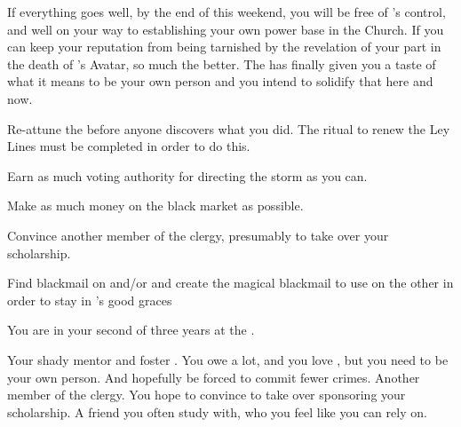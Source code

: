 \documentclass[char]{GL2020}
\begin{document}
If everything goes well, by the end of this weekend, you will be free of \cAntiChup{}’s control, and well on your way to establishing your own power base in the Church. If you can keep your reputation from being tarnished by the revelation of your part in the death of \cEbb{}’s Avatar, so much the better. The \pSchool{} has finally given you a taste of what it means to be your own person and you intend to solidify that here and now.

\begin{itemz}[Goals]
	\item Re-attune the \iNet{} before anyone discovers what you did. The ritual to renew the Ley Lines must be completed in order to do this.
	\item Earn as much voting authority for directing the storm as you can.
	\item Make as much money on the black market as possible.
	\item Convince another member of the \pTech{} clergy, presumably \cBeetle{} to take over your scholarship.
	\item Find blackmail on \cInitiate{} and/or \cPirate{} and create the magical blackmail to use on the other in order to stay in \cAntiChup{}’s good graces
\end{itemz}

\begin{itemz}[Notes]
	\item You are in your second of three years at the \pSchool{}.
\end{itemz}

\begin{contacts}
	\contact{\cAntiChup{}} Your shady mentor and foster \cAntiChup{\parent}. You owe \cAntiChup{\them} a lot, and you love \cAntiChup{\them}, but you need to be your own person. And hopefully be forced to commit fewer crimes.
	\contact{\cBeetle{}} Another member of the \pTech{} clergy. You hope to convince \cBeetle{\them} to take over sponsoring your scholarship.
\contact{\cTechStar{}}A friend you often study with, who you feel like you can rely on. 
\end{contacts}
\end{document}
